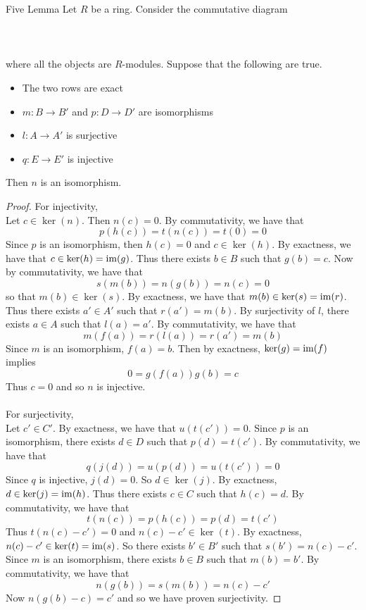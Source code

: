 \documentclass[a4paper]{article}
\begin{document}
\begin{lmm}{Five Lemma}{} Let $R$ be a ring. Consider the commutative diagram \\~\\
\\~\\
where all the objects are $R$-modules. Suppose that the following are true. 
\begin{itemize}
\item The two rows are exact
\item $m:B\to B'$ and $p:D\to D'$ are isomorphisms
\item $l:A\to A'$ is surjective
\item $q:E\to E'$ is injective
\end{itemize}
Then $n$ is an isomorphism. 
\begin{proof}
For injectivity, \\
Let $c\in\ker(n)$. Then $n(c)=0$. By commutativity, we have that $$p(h(c))=t(n(c))=t(0)=0$$ Since $p$ is an isomorphism, then $h(c)=0$ and $c\in\ker(h)$. By exactness, we have that $c\in\ker(h)=\operatorname{im}(g)$. Thus there exists $b\in B$ such that $g(b)=c$. Now by commutativity, we have that $$s(m(b))=n(g(b))=n(c)=0$$ so that $m(b)\in\ker(s)$. By exactness, we have that $m(b)\in\ker(s)=\operatorname{im}(r)$. Thus there exists $a'\in A'$ such that $r(a')=m(b)$. By surjectivity of $l$, there exists $a\in A$ such that $l(a)=a'$. By commutativity, we have that $$m(f(a))=r(l(a))=r(a')=m(b)$$ Since $m$ is an isomorphism, $f(a)=b$. Then by exactness, $\ker(g)=\operatorname{im}(f)$ implies $$0=g(f(a))g(b)=c$$ Thus $c=0$ and so $n$ is injective. \\~\\

For surjectivity, \\
Let $c'\in C'$. By exactness, we have that $u(t(c'))=0$. Since $p$ is an isomorphism, there exists $d\in D$ such that $p(d)=t(c')$. By commutativity, we have that $$q(j(d))=u(p(d))=u(t(c'))=0$$ Since $q$ is injective, $j(d)=0$. So $d\in\ker(j)$. By exactness, $d\in\ker(j)=\operatorname{im}(h)$. Thus there exists $c\in C$ such that $h(c)=d$. By commutativity, we have that $$t(n(c))=p(h(c))=p(d)=t(c')$$ Thus $t(n(c)-c')=0$ and $n(c)-c'\in\ker(t)$. By exactness, $n(c)-c'\in\ker(t)=\operatorname{im}(s)$. So there exists $b'\in B'$ such that $s(b')=n(c)-c'$. Since $m$ is an isomorphism, there exists $b\in B$ such that $m(b)=b'$. By commutativity, we have that $$n(g(b))=s(m(b))=n(c)-c'$$ Now $n(g(b)-c)=c'$ and so we have proven surjectivity. 
\end{proof}
\end{lmm}
\end{document}
